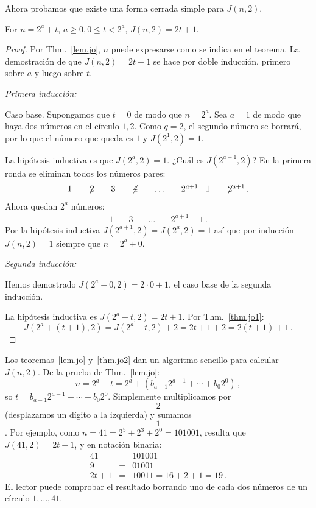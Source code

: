 Ahora probamos que existe una forma cerrada simple para $J(n,2)$. 
\begin{theorem}\label{thm.jo2}
For $n=2^a+t$, $a\geq 0, 0\leq t < 2^a$, $J(n,2)=2t+1$.
\end{theorem}

\begin{proof}
Por Thm.~\ref{lem.jo}, $n$ puede expresarse como se indica en el teorema. La demostración de que $J(n,2)=2t+1$ se hace por doble inducción, primero sobre $a$ y luego sobre $t$.

\textit{Primera inducción:}

Caso base. Supongamos que $t=0$ de modo que $n=2^a$. Sea $a=1$ de modo que haya dos números en el círculo $1,2$. Como $q=2$, el segundo número se borrará, por lo que el número que queda es $1$ y $J(2^1,2)=1$.

La hipótesis inductiva es que $J(2^a,2)=1$. ¿Cuál es $J(2^{a+1},2)$? En la primera ronda se eliminan todos los números pares:
\[
\begin{array}{rrrrrrrrrrrrrrrrrrrrrrrrrrrr}
1&\quad\not\! 2&\quad3&\quad\not\! 4& \quad\ldots&\quad 2^{a+1}\!-\!1&\quad \not\! 2^{a+1}\,.
\end{array}
\]
Ahora quedan $2^a$ números:
\[
\begin{array}{rrrrrrrrrrrrrrrrrrrrrrrrrrrr}
1&\quad3&\quad\ldots&\quad 2^{a+1}\!-\!1\,.
\end{array}
\]
Por la hipótesis inductiva $J(2^{a+1},2)=J(2^a,2)=1$ así que por inducción $J(n,2)=1$ siempre que $n=2^a+0$.

\textit{Segunda inducción:}

Hemos demostrado $J(2^a+0,2)=2\cdot 0 +1$, el caso base de la segunda inducción.

La hipótesis inductiva es $J(2^a+t,2)=2t+1$. Por Thm.~\ref{thm.jo1}:
\[
J(2^a+(t+1),2)=J(2^a+t,2)+2=2t+1+2=2(t+1)+1\,.
\]
\end{proof}

Los teoremas~\ref{lem.jo} y~\ref{thm.jo2} dan un algoritmo sencillo para calcular $J(n,2)$. De la prueba de Thm.~\ref{lem.jo}:
\[
n=2^a+t=2^a+(b_{a-1}2^{a-1}+\cdots+b_{0}2^{0})\,,
\]
so $t=b_{a-1}2^{a-1}+\cdots+b_{0}2^{0}$. Simplemente multiplicamos por $$2$$ (desplazamos un dígito a la izquierda) y sumamos $$1$$. Por ejemplo, como $n=41=2^5+2^3+2^0=101001$, resulta que $J(41,2)=2t+1$, y en notación binaria:
\begin{eqnarray*}
41&=&101001\\
9&=&01001\\
2t+1&=&10011=16+2+1=19\,.
\end{eqnarray*}
El lector puede comprobar el resultado borrando uno de cada dos números de un círculo $1,\ldots,41$.

